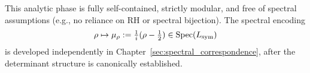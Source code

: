 \medskip

This analytic phase is fully self-contained, strictly modular, and free of spectral assumptions (e.g., no reliance on RH or spectral bijection). The spectral encoding
\[
\rho \mapsto \mu_\rho := \tfrac{1}{i}(\rho - \tfrac{1}{2}) \in \operatorname{Spec}(L_{\mathrm{sym}})
\]
is developed independently in Chapter~\ref{sec:spectral_correspondence}, after the determinant structure is canonically established.
